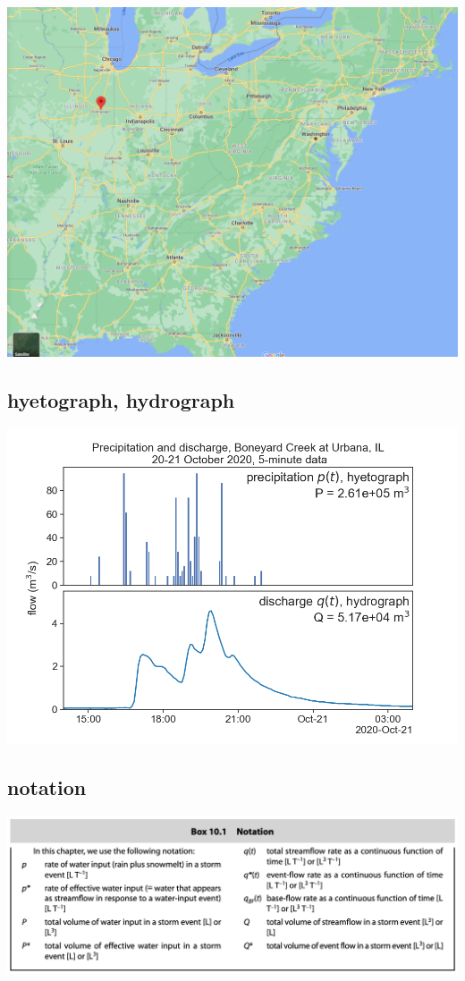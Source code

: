 \documentclass[
  letterpaper,
  DIV=11,
  numbers=noendperiod]{scrreprt}
\begin{document}
\includegraphics{archive/figures/urbana-IL-map.png}

\hypertarget{hyetograph-hydrograph}{%
\subsection{hyetograph, hydrograph}\label{hyetograph-hydrograph}}

\includegraphics{archive/figures/urbana_pq.png}

\hypertarget{notation}{%
\subsection{notation}\label{notation}}

\includegraphics{archive/figures/dingman-box10.1.png}
\end{document}

